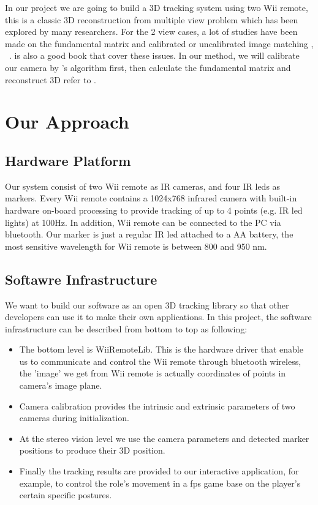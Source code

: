 \documentclass[10pt,twocolumn,letterpaper]{article}
\begin{document}
In our project we are going to build a 3D tracking system using two Wii
remote, this is a classic 3D reconstruction from multiple view problem 
which has been explored by many researchers. For the 2 view cases, 
a lot of studies have been made on the fundamental 
matrix and calibrated or uncalibrated image matching
\cite{luong95},\cite{Higgins87} \cite{Zhang95}~\cite{Hartley95}. 
\cite{Hartley03} is also a good book that cover these issues. 
In our method, we will calibrate our camera by \cite{Zhang00}'s 
algorithm first, then calculate the fundamental matrix 
and reconstruct 3D refer to \cite{Faugeras92}.

\section{Our Approach}


\subsection{Hardware Platform}
Our system consist of two Wii remote as IR cameras, and four IR leds as markers.
Every Wii remote contains a 1024x768 infrared camera 
with built-in hardware on-board processing to provide 
tracking of up to 4 points (e.g. IR led lights) at 100Hz. 
In addition, Wii remote can be connected to the PC via bluetooth. 
Our marker is just a regular IR led attached to a AA battery, 
the most sensitive wavelength for Wii remote is between 800 and 950 nm.

\subsection{Softawre Infrastructure}
We want to build our software as an open 3D tracking library so that 
other developers can use it to make their own applications. In this project, 
the software infrastructure can be described from bottom to top as following:
\begin{itemize}
\item The bottom level is WiiRemoteLib. This is the hardware driver that enable
us to communicate and control the Wii remote through bluetooth wireless, 
the 'image' we get from Wii remote is actually coordinates of points
in camera's image plane.
\item Camera calibration provides the intrinsic and extrinsic parameters 
of two cameras during initialization.
\item At the stereo vision level we use the camera parameters and detected marker positions
to produce their 3D position.
\item Finally the tracking results are provided to our interactive application, 
for example, to control the role's movement in a fps game base on 
the player's certain specific postures.
\end{itemize}
\end{document}
